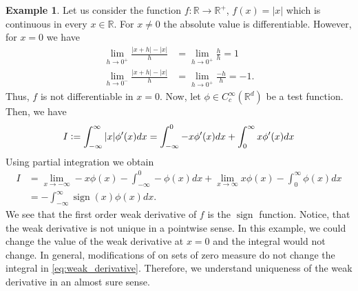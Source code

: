 \documentclass[12pt]{article}
\theoremstyle{definition}
\newtheorem{example}[example]{Example}
\numberwithin{equation}{section}
\newcommand{\R}{\mathbb{R}}
\newcommand{\defeq}{\vcentcolon=}
\DeclareMathOperator{\sign}{sign}
\begin{document}
\begin{example}
  Let us consider the function $f : \R \rightarrow \R^+$, $f(x) = |x|$ which is continuous in every $x \in \R$. For $x \neq 0$ the absolute value is differentiable. However, for $x = 0$ we have
  \begin{align*}
    \lim_{h\rightarrow 0^+} \frac{\lvert x + h \rvert - \lvert x \rvert}{h} &= \lim_{h\rightarrow 0^+} \frac{h}{h} = 1 \\
    \lim_{h\rightarrow 0^-} \frac{\lvert x + h \rvert - \lvert x \rvert}{h} &= \lim_{h\rightarrow 0^+} \frac{-h}{h} = -1.
  \end{align*}
  Thus, $f$ is not differentiable in $x = 0$.
  Now, let $\phi \in C_c^{\infty}(\R^d)$ be a test function. Then, we have
  \begin{equation*}
    I \defeq \int_{-\infty}^{\infty}|x|\phi'(x)dx = \int_{-\infty}^{0}-x\phi'(x)dx + \int_{0}^{\infty}x\phi'(x)dx
  \end{equation*}
  Using partial integration we obtain
  \begin{equation*}
    \begin{split}
      I &= \lim_{x \rightarrow -\infty} -x \phi(x) - \int_{-\infty}^{0}-\phi(x)dx + \lim_{x \rightarrow \infty} x \phi(x) - \int_{0}^{\infty}\phi(x)dx \\
      &= -\int_{-\infty}^{\infty}\sign(x)\phi(x)dx.
    \end{split}
  \end{equation*}
  We see that the first order weak derivative of $f$ is the $\sign$ function. Notice, that the weak derivative is not unique in a pointwise sense. In this example, we could change the value of the weak derivative at $x=0$ and the integral would not change. In general, modifications of on sets of zero measure do not change the integral in \eqref{eq:weak_derivative}. Therefore, we understand uniqueness of the weak derivative in an almost sure sense.
\end{example}
\end{document}
